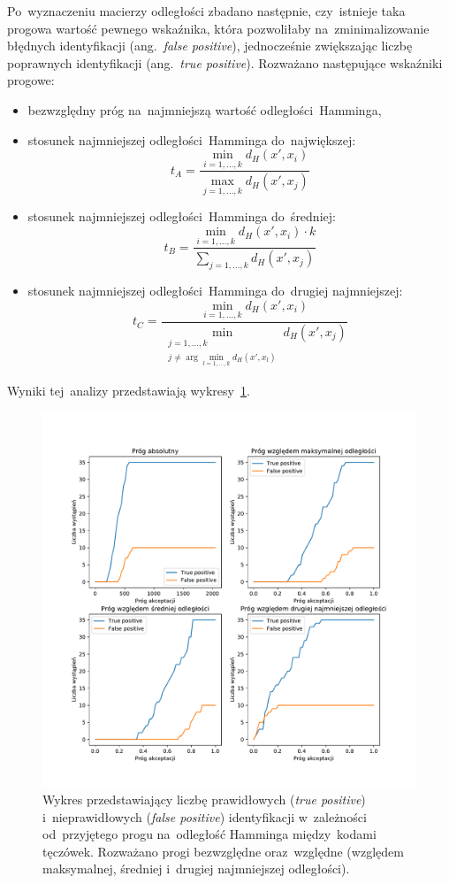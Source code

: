 \documentclass[11pt,a4paper]{article}
\begin{document}
Po~wyznaczeniu macierzy odległości zbadano następnie, czy~istnieje taka progowa wartość pewnego wskaźnika, która pozwoliłaby na~zminimalizowanie błędnych identyfikacji (ang.~\emph{false positive}), jednocześnie zwiększając liczbę poprawnych identyfikacji (ang.~\emph{true positive}).
Rozważano następujące wskaźniki progowe:
\begin{itemize}
    \item bezwzględny próg na~najmniejszą wartość odległości~Hamminga,
    \item stosunek najmniejszej odległości~Hamminga do~największej:
    $$ t_A = \frac{\min_{i=1, \dots, k} d_H(x', x_i)}{\max_{j=1, \dots, k} d_H(x', x_j)}$$
    \item stosunek najmniejszej odległości~Hamminga do~średniej:
    $$ t_B = \frac{\min_{i=1, \dots, k} d_H(x', x_i) \cdot k}{\sum_{j=1, \dots, k} d_H(x', x_j)} $$
    \item stosunek najmniejszej odległości~Hamminga do~drugiej najmniejszej:
    $$ t_C = \frac{\min_{i=1, \dots, k} d_H(x', x_i)}{\min_{\substack{j=1, \dots, k \\ j \neq \arg \min_{l=1, \dots, k} d_H(x', x_l)}} d_H(x', x_j)}$$
\end{itemize}
Wyniki tej~analizy przedstawiają wykresy~\ref{fig:false-true-positives}.

\begin{figure}
    \centering
    \includegraphics[width=\textwidth]{res/img/false-true-positives.pdf}
    \caption{
        Wykres przedstawiający liczbę prawidłowych (\emph{true positive}) i~nieprawidłowych (\emph{false positive}) identyfikacji w~zależności od~przyjętego progu na~odległość Hamminga między~kodami tęczówek.
        Rozważano progi bezwzględne oraz~względne (względem maksymalnej, średniej i~drugiej najmniejszej odległości).
    }
    \label{fig:false-true-positives}
\end{figure}
\end{document}
